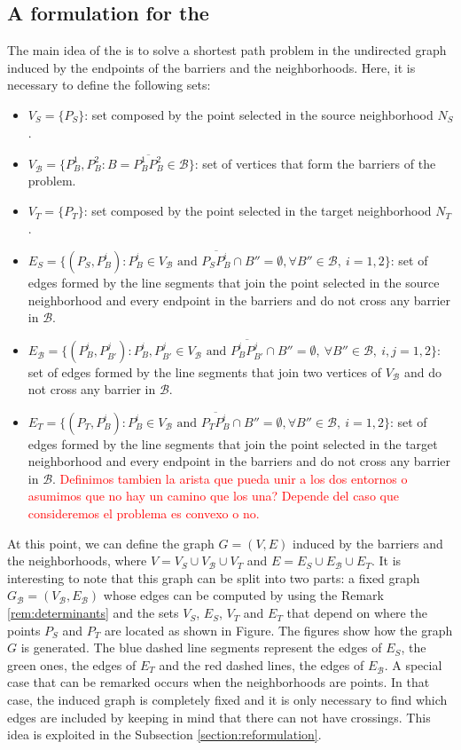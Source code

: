 \documentclass[a4paper]{elsarticle}
\newcommand{\SPP}{{\sf{SPPN-P} \xspace}}
\newcommand{\B}{{\mathcal B}}
\newcommand{\VB}{{V^{}_{\mathcal B}}}
\newcommand{\EB}{{E^{}_{\mathcal B}}}
\newcommand{\VS}{{V^{}_{S}}}
\newcommand{\ES}{{E^{}_{S}}}
\newcommand{\VT}{{V^{}_{T}}}
\newcommand{\ET}{{E^{}_{T}}}
\begin{document}
\subsection{A formulation for the \SPP}
The main idea of the \SPP is to solve a shortest path problem in the undirected graph induced by the endpoints of the barriers and the neighborhoods. Here, it is necessary to define the following sets:
\begin{itemize}
\item $\VS=\{P_S\}$: set composed by the point selected in the source neighborhood $N_S$.
\item $\VB=\{P^1_B, P^2_B:B=\overline{P^1_B P^2_B}\in \mathcal B\}$: set of vertices that form the barriers of the problem.
\item $\VT=\{P^{}_T\}$: set composed by the point selected in the target neighborhood $N_T$.
\item $\ES=\{(P_S, P^i_{B}):P^i_B\in V_\B\text{ and } \overline{P_SP^i_B}\cap B''=\emptyset,\forall B''\in\B,\:i=1,2\}$: set of edges formed by the line segments that join the point selected in the source neighborhood and every endpoint in the barriers and do not cross any barrier in $\B$.
\item $\EB=\{(P^{i}_B, P^{j}_{B'}):P^i_B, P^j_{B'}\in \VB \text{ and } \overline{P^i_B P^j_{B'}}\cap B''=\emptyset,\:\forall B''\in\mathcal B,\:i, j=1,2\}$: set of edges formed by the line segments that join two vertices of $V_{\mathcal B}$ and do not cross any barrier in $\B$.
\item $\ET=\{(P^{}_T, P^i_{B}):P^i_B\in V_\B\text{ and } \overline{P^{}_TP^i_B}\cap B''=\emptyset,\forall B''\in\B,\:i=1,2\}$: set of edges formed by the line segments that join the point selected in the target neighborhood and every endpoint in the barriers and do not cross any barrier in $\B$.
\textcolor{red}{Definimos tambien la arista que pueda unir a los dos entornos o asumimos que no hay un camino que los una? Depende del caso que consideremos el problema es convexo o no.}
\end{itemize} 

At this point, we can define the graph $G= (V, E)$ induced by the barriers and the neighborhoods, where $V=\VS\cup \VB\cup\VT$ and $E=\ES\cup\EB \cup\ET$. It is interesting to note that this graph can be split into two parts: a fixed graph $G_\B=(\VB,\EB)$ whose edges can be computed by using the Remark \ref{rem:determinants} and the sets $\VS$, $\ES$, $\VT$ and $\ET$ that depend on where the points $P_S$ and $P^{}_T$ are located as shown in Figure.  The figures show how the graph $G$ is generated. The blue dashed line segments represent the edges of $\ES$, the green ones, the edges of $\ET$ and the red dashed lines, the edges of $\EB$. A special case that can be remarked occurs when the neighborhoods are points. In that case, the induced graph is completely fixed and it is only necessary to find which edges are included by keeping in mind that there can not have crossings. This idea is exploited in the Subsection \ref{section:reformulation}.
\end{document}
